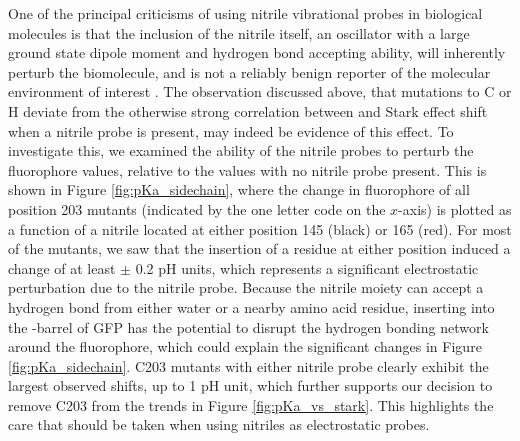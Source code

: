 One of the principal criticisms of using nitrile vibrational probes in biological molecules is that the inclusion of the nitrile itself, an oscillator with a large ground state dipole moment and hydrogen bond accepting ability, will inherently perturb the biomolecule, and is not a reliably benign reporter of the molecular environment of interest \cite{Adhikary2014}.
The observation discussed above, that mutations to C or H deviate from the otherwise strong correlation between \pKa{} and Stark effect shift when a nitrile probe is present, may indeed be evidence of this effect.
To investigate this, we examined the ability of the nitrile probes to perturb the fluorophore \pKa{} values, relative to the values with no nitrile probe present.
This is shown in Figure \ref{fig:pKa_sidechain}, where the change in fluorophore \pKa{} of all position 203 mutants (indicated by the one letter code on the $x$-axis) is plotted as a function of a nitrile located at either position 145 (black) or 165 (red).
For most of the mutants, we saw that the insertion of a \pCNF{} residue at either position induced a \pKa{} change of at least $\pm$ 0.2 pH units, which represents a significant electrostatic perturbation due to the nitrile probe.
Because the nitrile moiety can accept a hydrogen bond from either water or a nearby amino acid residue, inserting \pCNF{} into the \textbeta{}-barrel of GFP has the potential to disrupt the hydrogen bonding network around the fluorophore, which could explain the significant \pKa{} changes in Figure \ref{fig:pKa_sidechain}.
C203 mutants with either nitrile probe clearly exhibit the largest observed \pKa{} shifts, up to 1 pH unit, which further supports our decision to remove C203 from the trends in Figure \ref{fig:pKa_vs_stark}.
This highlights the care that should be taken when using nitriles as electrostatic probes.

